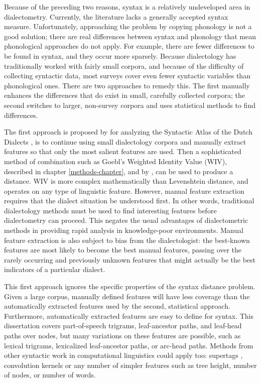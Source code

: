 Because of the preceding two reasons, syntax is a relatively
undeveloped area in dialectometry. Currently, the literature lacks a
generally accepted syntax measure. Unfortunately, approaching the
problem by copying phonology is not a good solution; there are real
differences between syntax and phonology that mean phonological
approaches do not apply. For example, there are fewer differences to
be found in syntax, and they occur more sparsely.  Because
dialectology has traditionally worked with fairly small corpora, and
because of the difficulty of collecting syntactic data, most surveys
cover even fewer syntactic variables than phonological ones. There are
two approaches to remedy this. The first manually enhances the
differences that do exist in small, carefully collected corpora; the
second switches to larger, non-survey corpora and uses statistical
methods to find differences.

The first approach is proposed by  for analyzing
the Syntactic Atlas of the Dutch Dialects \cite{barbiers05}, is to
continue using small dialectology corpora and manually extract
features so that only the most salient features are used. Then a
sophisticated method of combination such as Goebl's Weighted Identity
Value (WIV), described in chapter \ref{methods-chapter}, and by , can be used to
produce a distance. WIV is more complex mathematically than
Levenshtein distance, and operates on any type of linguistic
feature. However, manual feature extraction requires that the dialect
situation be understood first. In other words, traditional
dialectology methods must be used to find interesting features before
dialectometry can proceed. This negates the usual advantages of dialectometric
methods in providing rapid analysis in knowledge-poor environments.
Manual feature extraction is also subject to bias from the dialectologist:
the best-known features are most likely to become the best manual
features, passing over the rarely occurring and previously unknown
features that might actually be the best indicators of a particular
dialect.

This first approach ignores the specific properties of the syntax
distance problem. Given a large corpus, manually defined features will
have less coverage than the automatically extracted features used by
the second, statistical approach. Furthermore, automatically extracted
features are easy to define for syntax.  This dissertation covers
part-of-speech trigrams, leaf-ancestor paths, and leaf-head paths
over nodes, but many variations on these features are possible, such
as lexical trigrams, lexicalized leaf-ancestor paths, or arc-head
paths. Methods from other syntactic work in
computational linguistics could apply too: supertags \cite{joshi94},
convolution kernels \cite{collins01} or any number of simpler features
such as tree height, number of nodes, or number of words.

